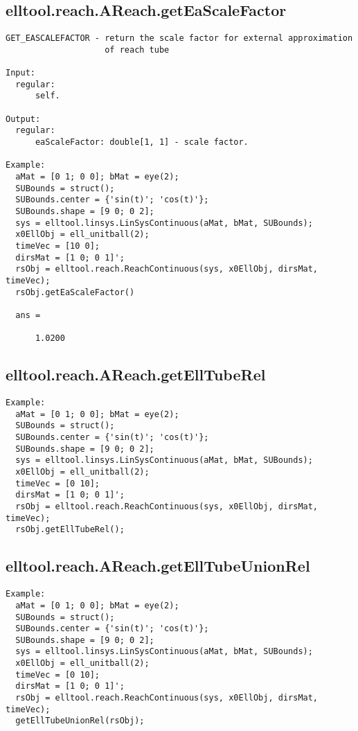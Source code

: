 \subsection{\texorpdfstring{elltool.reach.AReach.getEaScaleFactor}{getEaScaleFactor}}\label{method:elltool.reach.AReach.getEaScaleFactor}
\begin{verbatim}
GET_EASCALEFACTOR - return the scale factor for external approximation
                    of reach tube

Input:
  regular:
      self.

Output:
  regular:
      eaScaleFactor: double[1, 1] - scale factor.

Example:
  aMat = [0 1; 0 0]; bMat = eye(2);
  SUBounds = struct();
  SUBounds.center = {'sin(t)'; 'cos(t)'};
  SUBounds.shape = [9 0; 0 2];
  sys = elltool.linsys.LinSysContinuous(aMat, bMat, SUBounds);
  x0EllObj = ell_unitball(2);
  timeVec = [10 0];
  dirsMat = [1 0; 0 1]';
  rsObj = elltool.reach.ReachContinuous(sys, x0EllObj, dirsMat, timeVec);
  rsObj.getEaScaleFactor()

  ans =

      1.0200
\end{verbatim}
\subsection{\texorpdfstring{elltool.reach.AReach.getEllTubeRel}{getEllTubeRel}}\label{method:elltool.reach.AReach.getEllTubeRel}
\begin{verbatim}
Example:
  aMat = [0 1; 0 0]; bMat = eye(2);
  SUBounds = struct();
  SUBounds.center = {'sin(t)'; 'cos(t)'};
  SUBounds.shape = [9 0; 0 2];
  sys = elltool.linsys.LinSysContinuous(aMat, bMat, SUBounds);
  x0EllObj = ell_unitball(2);
  timeVec = [0 10];
  dirsMat = [1 0; 0 1]';
  rsObj = elltool.reach.ReachContinuous(sys, x0EllObj, dirsMat, timeVec);
  rsObj.getEllTubeRel();
\end{verbatim}
\subsection{\texorpdfstring{elltool.reach.AReach.getEllTubeUnionRel}{getEllTubeUnionRel}}\label{method:elltool.reach.AReach.getEllTubeUnionRel}
\begin{verbatim}
Example:
  aMat = [0 1; 0 0]; bMat = eye(2);
  SUBounds = struct();
  SUBounds.center = {'sin(t)'; 'cos(t)'};
  SUBounds.shape = [9 0; 0 2];
  sys = elltool.linsys.LinSysContinuous(aMat, bMat, SUBounds);
  x0EllObj = ell_unitball(2);
  timeVec = [0 10];
  dirsMat = [1 0; 0 1]';
  rsObj = elltool.reach.ReachContinuous(sys, x0EllObj, dirsMat, timeVec);
  getEllTubeUnionRel(rsObj);
\end{verbatim}
